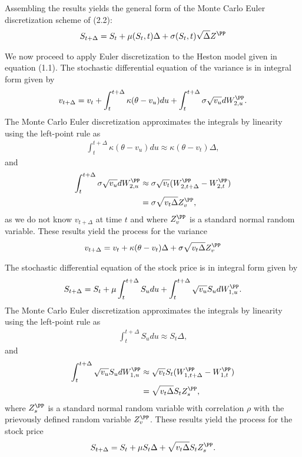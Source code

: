 \documentclass[11pt]{article}
\numberwithin{equation}{section}
\begin{document}
Assembling the results yields the general form of the Monte Carlo Euler
discretization scheme of (2.2):
\begin{align*}
    S_{t+\Delta} = S_t + \mu(S_t, t)  \Delta + \sigma(S_t, t) \sqrt{\Delta} Z^\PP
\end{align*}


We now proceed to apply Euler discretization to the Heston model given in
equation (1.1). The stochastic differential equation of the variance is in integral form
given by
\begin{align*}
    v_{t+\Delta}=v_t+\int_t^{t+\Delta}\kappa(\theta-v_u)du+\int_t^{t+\Delta}\sigma\sqrt{v_u}dW_{2,u}^\PP.
\end{align*}
The Monte Carlo Euler discretization approximates the integrals by linearity using the
left-point rule as
\begin{align*}
    \int_t^{t+\Delta}\kappa(\theta-v_u)du\approx \kappa(\theta-v_t)\Delta,
\end{align*}
and
\begin{align*}
    \int_t^{t+\Delta}\sigma\sqrt{v_u}dW_{2,u}^\PP &\approx \sigma \sqrt{v_t}(W_{2,t+\Delta}^\PP-W_{2,t}^\PP)\\
    &=\sigma \sqrt{v_t \Delta}Z_v^\PP,
\end{align*}
as we do not know $v_{t+\Delta}$ at time $t$ and where $Z_v^\PP$ is a standard normal
random variable. These results yield the process for the variance
\begin{align*}
    v_{t+\Delta}=v_t+\kappa(\theta-v_t)\Delta +\sigma\sqrt{v_t \Delta}Z_v^\PP
\end{align*}


The stochastic differential equation of the stock price is in integral form
given by
\begin{align*}
    S_{t+\Delta}=S_t+\mu\int_t^{t+\Delta}S_u du+\int_t^{t+\Delta}\sqrt{v_u}S_udW_{1,u}^\PP.
\end{align*}
The Monte Carlo Euler discretization approximates the integrals by linearity
using the left-point rule as
\begin{align*}
    \int_t^{t+\Delta}S_u du\approx S_t \Delta,
\end{align*}
and
\begin{align*}
    \int_t^{t+\Delta} \sqrt{v_u}S_udW_{1,u}^\PP&\approx \sqrt{v_t}S_t(W_{1,t+\Delta}^\PP-W_{1,t}^\PP)\\
    &=\sqrt{v_t\Delta}S_tZ_s^\PP,
\end{align*}
where $Z_s^\PP$ is a standard normal random variable with correlation $\rho$ with
the prievously defined random variable $Z_v^\PP$. These results yield the process
for the stock price
\begin{align*}
    S_{t+\Delta}=S_t+\mu S_t \Delta +\sqrt{v_t \Delta }S_tZ_s^\PP.
\end{align*} 
\end{document}
